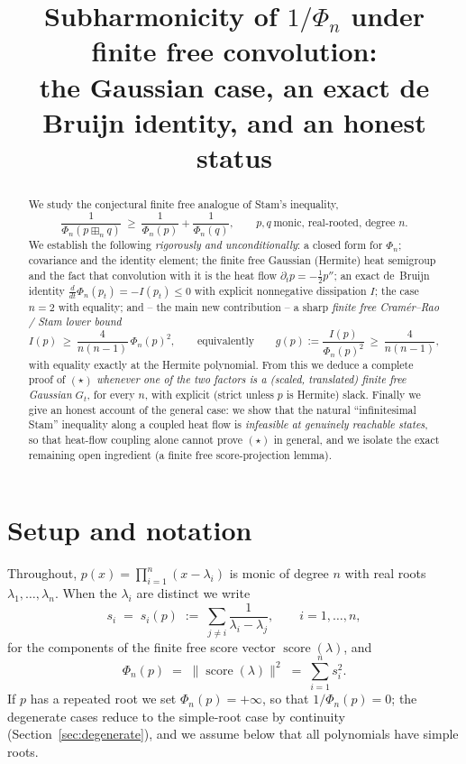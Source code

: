 \documentclass[12pt]{article}
\title{Subharmonicity of $1/\Phi_n$ under finite free convolution:\\
the Gaussian case, an exact de Bruijn identity, and an honest status}
\author{}
\date{}
\theoremstyle{remark}
\DeclareMathOperator{\score}{score}
\newcommand{\boxp}{\boxplus_n}
\begin{document}
\maketitle

\begin{abstract}
We study the conjectural finite free analogue of Stam's inequality,
\[
\frac{1}{\Phi_n(p\boxp q)}\ \ge\ \frac{1}{\Phi_n(p)}+\frac{1}{\Phi_n(q)},
\qquad p,q\ \text{monic, real-rooted, degree }n. \tag{$\star$}
\]
We establish the following \emph{rigorously and unconditionally}: a closed form
for $\Phi_n$; covariance and the identity element; the finite free Gaussian
(Hermite) heat semigroup and the fact that convolution with it is the heat flow
$\partial_t p=-\tfrac12 p''$; an exact de~Bruijn identity
$\frac{d}{dt}\Phi_n(p_t)=-I(p_t)\le0$ with explicit nonnegative dissipation
$I$; the case $n=2$ with equality; and -- the main new contribution -- a sharp
\emph{finite free Cram\'er--Rao / Stam lower bound}
\[
I(p)\ \ge\ \frac{4}{n(n-1)}\,\Phi_n(p)^2,\qquad\text{equivalently}\qquad
g(p):=\frac{I(p)}{\Phi_n(p)^2}\ \ge\ \frac{4}{n(n-1)},
\]
with equality exactly at the Hermite polynomial.  From this we deduce a
complete proof of $(\star)$ \emph{whenever one of the two factors is a (scaled,
translated) finite free Gaussian} $G_t$, for every $n$, with explicit (strict
unless $p$ is Hermite) slack.  Finally we give an honest account of the
general case: we show that the natural ``infinitesimal Stam'' inequality along
a coupled heat flow is \emph{infeasible at genuinely reachable states}, so that
heat-flow coupling alone cannot prove $(\star)$ in general, and we isolate the
exact remaining open ingredient (a finite free score-projection lemma).
\end{abstract}

\section{Setup and notation}

Throughout, $p(x)=\prod_{i=1}^n(x-\lambda_i)$ is monic of degree $n$ with real
roots $\lambda_1,\dots,\lambda_n$.  When the $\lambda_i$ are distinct we write
\[
s_i \;=\; s_i(p)\;:=\;\sum_{j\neq i}\frac{1}{\lambda_i-\lambda_j},
\qquad i=1,\dots,n,
\]
for the components of the finite free score vector $\score(\lambda)$, and
\[
\Phi_n(p)\;=\;\|\score(\lambda)\|^2\;=\;\sum_{i=1}^n s_i^2 .
\]
If $p$ has a repeated root we set $\Phi_n(p)=+\infty$, so that $1/\Phi_n(p)=0$;
the degenerate cases reduce to the simple-root case by continuity
(Section~\ref{sec:degenerate}), and we assume below that all polynomials have
simple roots.
\end{document}
